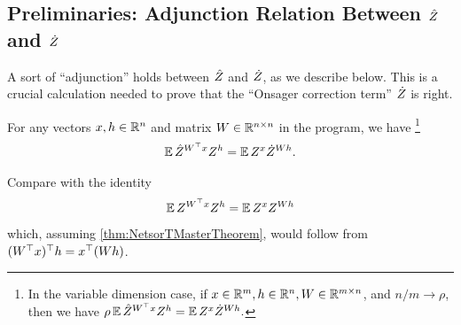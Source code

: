 \documentclass[main.tex]{subfiles}
\begin{document}
\subsection{Preliminaries: Adjunction Relation Between \texorpdfstring{$\hat Z$}{Z hat} and \texorpdfstring{$\dot Z$}{Z check}}
A sort of ``adjunction'' holds between $\hat Z$ and $\dot Z$, as we describe below.
This is a crucial calculation needed to prove that the ``Onsager correction term'' $\dot Z$ is right.
\begin{lemma}\label{lemma:DtrxAdjunction}
For any vectors $x, h \in \mathbb{R}^n$ and matrix $W\in \mathbb{R}^{n\times n}$ in the program, we have%
\footnote{
  In the variable dimension case, if $x \in \mathbb{R}^m, h \in \mathbb{R}^n, W \in \mathbb{R}^{m \times n}$, and $n/m \to \rho$, then we have
  $\rho \operatorname*{\mathbb{E}} \hat Z^{W^\top x} Z^h = \operatorname*{\mathbb{E}} Z^{x} \dot Z^{Wh}.$
}
\begin{align*}
  \operatorname*{\mathbb{E}} \hat Z^{W^\top x} Z^h = \operatorname*{\mathbb{E}} Z^{x} \dot Z^{Wh}.
\end{align*}
\end{lemma}
Compare with the identity
\[\operatorname*{\mathbb{E}} Z^{W^\top x} Z^h = \operatorname*{\mathbb{E}} Z^x Z^{Wh}\]
which, assuming \cref{thm:NetsorTMasterTheorem}, would follow from $(W^\top x)^\top h = x^\top (Wh)$.
\end{document}
